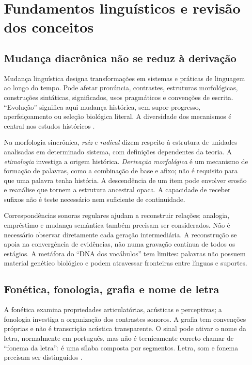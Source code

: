 \section{Fundamentos linguísticos e revisão dos conceitos}
\subsection{Mudança diacrônica não se reduz à derivação}
Mudança linguística designa transformações em sistemas e práticas de linguagem ao longo do tempo. Pode afetar pronúncia, contrastes, estruturas morfológicas, construções sintáticas, significados, usos pragmáticos e convenções de escrita. ``Evolução'' significa aqui mudança histórica, sem supor progresso, aperfeiçoamento ou seleção biológica literal. A diversidade dos mecanismos é central nos estudos históricos \cite{campbell2021,martelotta2008}.

Na morfologia sincrônica, \emph{raiz} e \emph{radical} dizem respeito à estrutura de unidades analisadas em determinado sistema, com definições dependentes da teoria. A \emph{etimologia} investiga a origem histórica. \emph{Derivação morfológica} é um mecanismo de formação de palavras, como a combinação de base e afixo; não é requisito para que uma palavra tenha história. A descendência de um item pode envolver erosão e reanálise que tornem a estrutura ancestral opaca. A capacidade de receber sufixos não é teste necessário nem suficiente de continuidade.

Correspondências sonoras regulares ajudam a reconstruir relações; analogia, empréstimo e mudança semântica também precisam ser considerados. Não é necessário observar diretamente cada geração intermediária. A reconstrução se apoia na convergência de evidências, não numa gravação contínua de todos os estágios. A metáfora do ``DNA dos vocábulos'' tem limites: palavras não possuem material genético biológico e podem atravessar fronteiras entre línguas e suportes.

\subsection{Fonética, fonologia, grafia e nome de letra}
A fonética examina propriedades articulatórias, acústicas e perceptivas; a fonologia investiga a organização dos contrastes sonoros. A grafia tem convenções próprias e não é transcrição acústica transparente. O sinal  pode ativar o nome da letra, normalmente  em português, mas não é tecnicamente correto chamar  de ``fonema da letra'': é uma sílaba composta por segmentos. Letra, som e fonema precisam ser distinguidos \cite{seara2015}.

